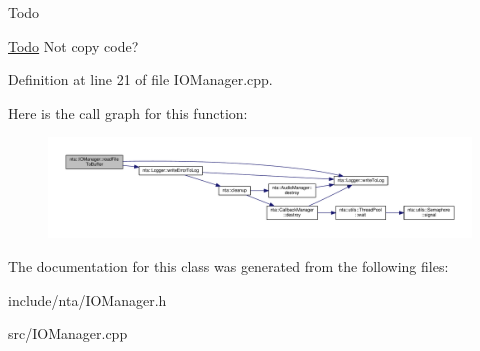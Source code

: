 \begin{DoxyRefDesc}{Todo}
\item[\hyperlink{todo__todo000007}{Todo}]Not copy code? \end{DoxyRefDesc}


Definition at line 21 of file I\+O\+Manager.\+cpp.

Here is the call graph for this function\+:
\nopagebreak
\begin{figure}[H]
\begin{center}
\leavevmode
\includegraphics[width=350pt]{d2/d54/classnta_1_1IOManager_abbfd9da05b22aa488043a19344d38e0a_cgraph}
\end{center}
\end{figure}


The documentation for this class was generated from the following files\+:\begin{DoxyCompactItemize}
\item 
include/nta/I\+O\+Manager.\+h\item 
src/I\+O\+Manager.\+cpp\end{DoxyCompactItemize}
